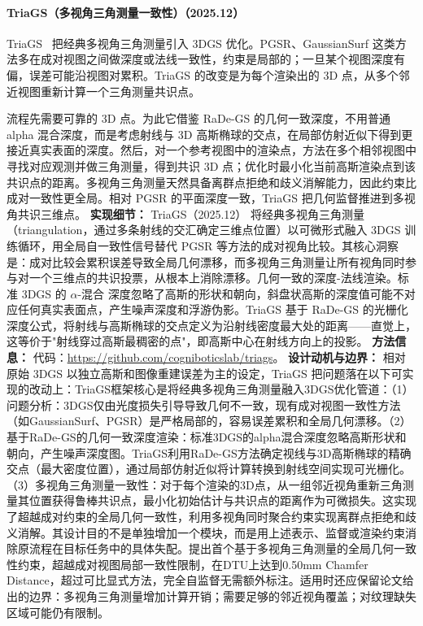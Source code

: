 \paragraph{TriaGS（多视角三角测量一致性）（2025.12）}
TriaGS~\cite{2512_06269} 把经典多视角三角测量引入 3DGS 优化。PGSR、GaussianSurf 这类方法多在成对视图之间做深度或法线一致性，约束是局部的；一旦某个视图深度有偏，误差可能沿视图对累积。TriaGS 的改变是为每个渲染出的 3D 点，从多个邻近视图重新计算一个三角测量共识点。

流程先需要可靠的 3D 点。为此它借鉴 RaDe-GS 的几何一致深度，不用普通 alpha 混合深度，而是考虑射线与 3D 高斯椭球的交点，在局部仿射近似下得到更接近真实表面的深度。然后，对一个参考视图中的渲染点，方法在多个相邻视图中寻找对应观测并做三角测量，得到共识 3D 点；优化时最小化当前高斯渲染点到该共识点的距离。多视角三角测量天然具备离群点拒绝和歧义消解能力，因此约束比成对一致性更全局。相对 PGSR 的平面深度一致，TriaGS 把几何监督推进到多视角共识三维点。
\textbf{实现细节：} TriaGS（2025.12） 将经典多视角三角测量（triangulation，通过多条射线的交汇确定三维点位置）以可微形式融入 3DGS 训练循环，用全局自一致性信号替代 PGSR 等方法的成对视角比较。其核心洞察是：成对比较会累积误差导致全局几何漂移，而多视角三角测量让所有视角同时参与对一个三维点的共识投票，从根本上消除漂移。几何一致的深度-法线渲染。标准 3DGS 的 $\alpha$-混合 深度忽略了高斯的形状和朝向，斜盘状高斯的深度值可能不对应任何真实表面点，产生噪声深度和浮游伪影。TriaGS 基于 RaDe-GS 的光栅化深度公式，将射线与高斯椭球的交点定义为沿射线密度最大处的距离——直觉上，这等价于"射线穿过高斯最稠密的点"，即高斯中心在射线方向上的投影。
\textbf{方法信息：} 代码：\url{https://github.com/cogniboticslab/triags}。
\textbf{设计动机与边界：} 相对原始 3DGS 以独立高斯和图像重建误差为主的设定，TriaGS 把问题落在以下可实现的改动上：TriaGS框架核心是将经典多视角三角测量融入3DGS优化管道：（1）问题分析：3DGS仅由光度损失引导导致几何不一致，现有成对视图一致性方法（如GaussianSurf、PGSR）是严格局部的，容易误差累积和全局几何漂移。（2）基于RaDe-GS的几何一致深度渲染：标准3DGS的alpha混合深度忽略高斯形状和朝向，产生噪声深度图。TriaGS利用RaDe-GS方法确定视线与3D高斯椭球的精确交点（最大密度位置），通过局部仿射近似将计算转换到射线空间实现可光栅化。（3）多视角三角测量一致性：对于每个渲染的3D点，从一组邻近视角重新三角测量其位置获得鲁棒共识点，最小化初始估计与共识点的距离作为可微损失。这实现了超越成对约束的全局几何一致性，利用多视角同时聚合约束实现离群点拒绝和歧义消解。其设计目的不是单独增加一个模块，而是用上述表示、监督或渲染约束消除原流程在目标任务中的具体失配。提出首个基于多视角三角测量的全局几何一致性约束，超越成对视图局部一致性限制，在DTU上达到0.50mm Chamfer Distance，超过可比显式方法，完全自监督无需额外标注。适用时还应保留论文给出的边界：多视角三角测量增加计算开销；需要足够的邻近视角覆盖；对纹理缺失区域可能仍有限制。
